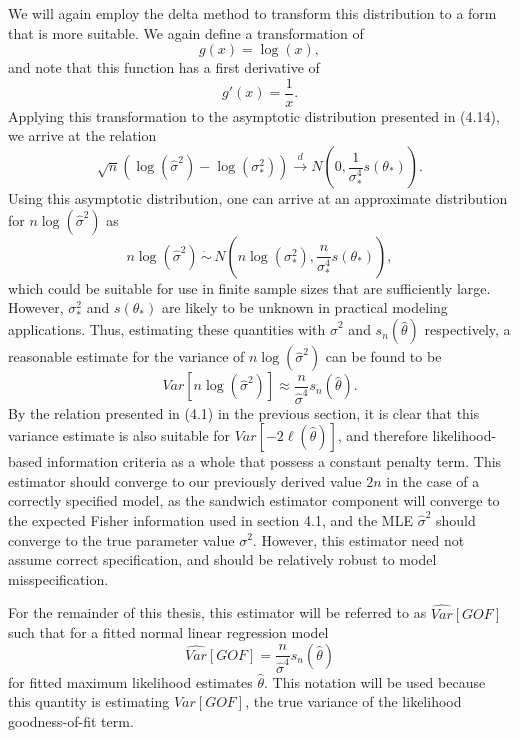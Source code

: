 		We will again employ the delta method to transform this distribution to a form that is more suitable. We again define a transformation of
		\begin{equation}
			g(x) = \log(x) ,
		\end{equation}
		and note that this function has a first derivative of
		\begin{equation}
			g'(x) = \frac{1}{x} .
		\end{equation}
		Applying this transformation to the asymptotic distribution presented in (4.14), we arrive at the relation
		\begin{equation}
			\sqrt{n} ( \log (\hat{\sigma}^2) - \log(\sigma_*^2)) \xrightarrow[]{d} N(0, \frac{1}{\sigma_*^4} s(\theta_*)) .
		\end{equation}
		Using this asymptotic distribution, one can arrive at an approximate distribution for $n\log(\hat{\sigma}^2)$ as
		\begin{equation}
			n\log(\hat{\sigma}^2) \, \dot\sim \, N \left( n\log(\sigma_* ^2), \frac{n}{\sigma_*^4} s(\theta_*) \right) ,
		\end{equation}
		which could be suitable for use in finite sample sizes that are sufficiently large. However, $\sigma_*^2$ and $s(\theta_*)$ are likely to be unknown in practical modeling
		applications. Thus, estimating these quantities with $\hat{\sigma}^2$ and $s_n(\hat{\theta})$ respectively, a reasonable estimate for the variance of $n\log(\hat{\sigma}^2)$ can
		be found to be
		\begin{equation}
			Var \left[ n\log(\hat{\sigma}^2) \right] \approx \frac{n}{\hat{\sigma}^4} s_n(\hat{\theta}) .
		\end{equation}
		By the relation presented in (4.1) in the previous section, it is clear that this variance estimate is also suitable for $Var \left[ -2 \ell (\hat{\theta}  ) \right]$, and therefore
		likelihood-based information criteria as a whole that possess a constant penalty term. This estimator should converge to our previously derived value $2n$ in the case of a correctly
		specified model, as the sandwich estimator component will converge to the expected Fisher information used in section 4.1, and the MLE $\hat{\sigma}^2$ should converge to the true
		parameter value $\sigma^2$. However, this estimator need not assume correct specification, and should be relatively robust to model misspecification.
		
		For the remainder of this thesis, this estimator will be referred to as $\widehat{Var}[GOF]$ such that for a fitted normal linear regression model
		\begin{equation}
			\widehat{Var}[GOF] = \frac{n}{\hat{\sigma}^4} s_n(\hat{\theta})
		\end{equation}
		for fitted maximum likelihood estimates $\hat{\theta}$. This notation will be used because this quantity is estimating $Var[GOF]$, the true variance of the likelihood goodness-of-fit
		term.
		
